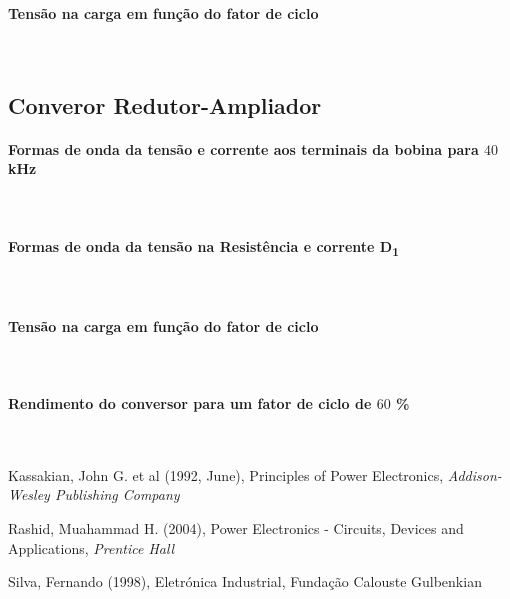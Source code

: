 \documentclass[a4paper,11pt]{article}
\numberwithin{equation}{section}
\begin{document}
\paragraph{Tensão na carga em função do fator de ciclo}\mbox{}\

\subsection{Converor Redutor-Ampliador}

\paragraph{Formas de onda da tensão e corrente aos terminais da bobina para $40$ kHz}\mbox{}\

\paragraph{Formas de onda da tensão na Resistência e corrente D\textsubscript{1}}\mbox{}\

\paragraph{Tensão na carga em função do fator de ciclo}\mbox{}\

\paragraph{Rendimento do conversor para um fator de ciclo de $60$ \%}\mbox{}\

\pagebreak

\begin{thebibliography}{2}
	
	Kassakian, John G. et al (1992, June), Principles of Power Electronics, \textit{Addison-Wesley Publishing Company}

	Rashid, Muahammad H. (2004), Power Electronics - Circuits, Devices and Applications, \textit{Prentice Hall}
	
	Silva, Fernando (1998), Eletrónica Industrial, Fundação Calouste Gulbenkian
	
\end{thebibliography}


\pagebreak
\end{document}
